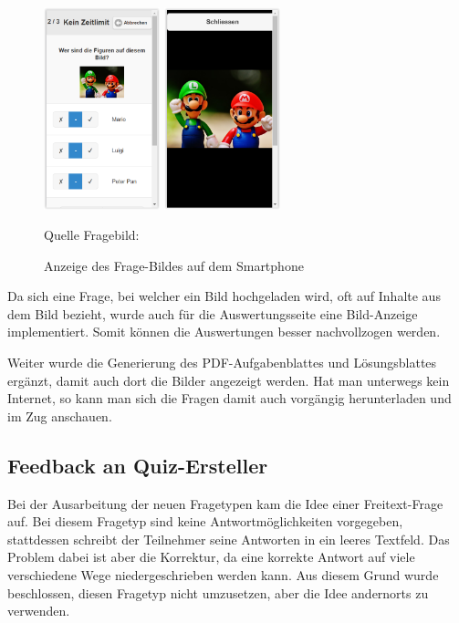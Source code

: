 \begin{figure}
	\centering
	\includegraphics[width=0.3\textwidth]{Images/Frage-Bild_Anzeige_Mobile.PNG}
	\includegraphics[width=0.3\textwidth]{Images/Frage-Bild_Anzeige_Mobile_Full.PNG}
	\caption{Anzeige des Frage-Bildes auf dem Smartphone}
	Quelle Fragebild: \cite{_bild_pixabay_mario_}
\end{figure}

Da sich eine Frage, bei welcher ein Bild hochgeladen wird, oft auf Inhalte aus dem Bild bezieht, wurde auch für die Auswertungsseite eine Bild-Anzeige implementiert. Somit können die Auswertungen besser nachvollzogen werden.

Weiter wurde die Generierung des PDF-Aufgabenblattes und Lösungsblattes ergänzt, damit auch dort die Bilder angezeigt werden. Hat man unterwegs kein Internet, so kann man sich die Fragen damit auch vorgängig herunterladen und im Zug anschauen.








\newpage
\subsection{Feedback an Quiz-Ersteller}
Bei der Ausarbeitung der neuen Fragetypen kam die Idee einer Freitext-Frage auf. Bei diesem Fragetyp sind keine Antwortmöglichkeiten vorgegeben, stattdessen schreibt der Teilnehmer seine Antworten in ein leeres Textfeld. Das Problem dabei ist aber die Korrektur, da eine korrekte Antwort auf viele verschiedene Wege niedergeschrieben werden kann. Aus diesem Grund wurde beschlossen, diesen Fragetyp nicht umzusetzen, aber die Idee andernorts zu verwenden.


